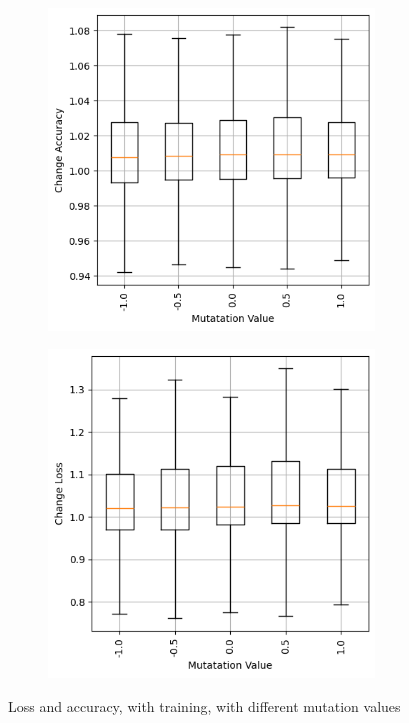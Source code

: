 \begin{figure}
    \begin{subfigure}{0.5\textwidth}
        \centering
        \includegraphics[width=0.95\textwidth]{plots/MutatationValue_Trained_accuracy.png}
    \end{subfigure}
    \begin{subfigure}{0.5\textwidth}
        \centering
        \includegraphics[width=0.95\textwidth]{plots/MutatationValue_Trained_loss.png}
    \end{subfigure}
    \caption{Loss and accuracy, with training, with different mutation values}
    \label{fig:mutation-values-training}
\end{figure}
